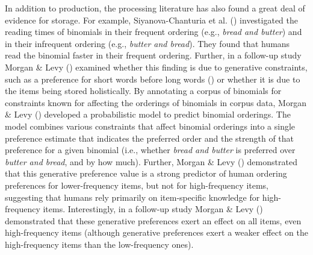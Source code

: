 \documentclass[
  12pt,
  letterpaper,
]{scrreprt}
\begin{document}
In addition to production, the processing literature has also found a
great deal of evidence for storage. For example, Siyanova-Chanturia et
al. ()
investigated the reading times of binomials in their frequent ordering
(e.g., \emph{bread and butter}) and in their infrequent ordering (e.g.,
\emph{butter and bread}). They found that humans read the binomial
faster in their frequent ordering. Further, in a follow-up study Morgan
\& Levy () examined whether this finding
is due to generative constraints, such as a preference for short words
before long words () or whether it is due to the items being stored
holistically. By annotating a corpus of binomials for constraints known
for affecting the orderings of binomials in corpus data, Morgan \& Levy
() developed a probabilistic model to
predict binomial orderings. The model combines various constraints that
affect binomial orderings into a single preference estimate that
indicates the preferred order and the strength of that preference for a
given binomial (i.e., whether \emph{bread and butter} is preferred over
\emph{butter and bread}, and by how much). Further, Morgan \& Levy
() demonstrated
that this generative preference value is a strong predictor of human
ordering preferences for lower-frequency items, but not for
high-frequency items, suggesting that humans rely primarily on
item-specific knowledge for high-frequency items. Interestingly, in a
follow-up study Morgan \& Levy ()
demonstrated that these generative preferences exert an effect on all
items, even high-frequency items (although generative preferences exert
a weaker effect on the high-frequency items than the low-frequency
ones).
\end{document}
